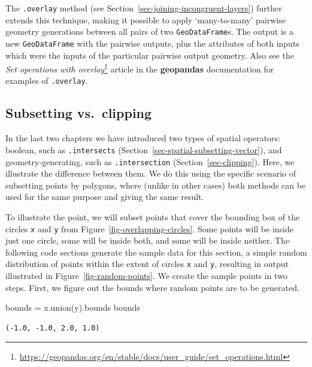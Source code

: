 \documentclass[
  letterpaper,
]{krantz}
\newenvironment{Shaded}{\begin{snugshade}}{\end{snugshade}}
\newcommand{\NormalTok}[1]{\textcolor[rgb]{0.00,0.23,0.31}{#1}}
\newcommand{\OperatorTok}[1]{\textcolor[rgb]{0.37,0.37,0.37}{#1}}
\begin{document}
The \texttt{.overlay} method (see
Section~\ref{sec-joining-incongruent-layers}) further extends this
technique, making it possible to apply `many-to-many' pairwise geometry
generations between all pairs of two \texttt{GeoDataFrame}s. The output
is a new \texttt{GeoDataFrame} with the pairwise outputs, plus the
attributes of both inputs which were the inputs of the particular
pairwise output geometry. Also see the \emph{Set operations with
overlay}\footnote{\url{https://geopandas.org/en/stable/docs/user_guide/set_operations.html}}
article in the \textbf{geopandas} documentation for examples of
\texttt{.overlay}.

\subsection{Subsetting vs.~clipping}\label{sec-subsetting-vs-clipping}

In the last two chapters we have introduced two types of spatial
operators: boolean, such as \texttt{.intersects}
(Section~\ref{sec-spatial-subsetting-vector}), and geometry-generating,
such as \texttt{.intersection} (Section~\ref{sec-clipping}). Here, we
illustrate the difference between them. We do this using the specific
scenario of subsetting points by polygons, where (unlike in other cases)
both methods can be used for the same purpose and giving the same
result.

To illustrate the point, we will subset points that cover the bounding
box of the circles \texttt{x} and \texttt{y} from
Figure~\ref{fig-overlapping-circles}. Some points will be inside just
one circle, some will be inside both, and some will be inside neither.
The following code sections generate the sample data for this section, a
simple random distribution of points within the extent of circles
\texttt{x} and \texttt{y}, resulting in output illustrated in
Figure~\ref{fig-random-points}. We create the sample points in two
steps. First, we figure out the bounds where random points are to be
generated.

\begin{Shaded}
\begin{Highlighting}[]
\NormalTok{bounds }\OperatorTok{=}\NormalTok{ x.union(y).bounds}
\NormalTok{bounds}
\end{Highlighting}
\end{Shaded}

\begin{verbatim}
(-1.0, -1.0, 2.0, 1.0)
\end{verbatim}
\end{document}
